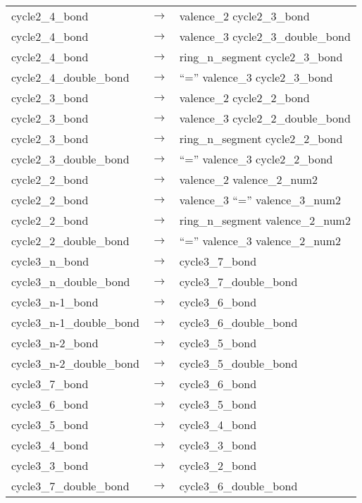 \begin{longtable}{m{} p{} p{}}
    cycle2\_4\_bond & $\rightarrow$ & valence\_2 cycle2\_3\_bond \\
    cycle2\_4\_bond & $\rightarrow$ & valence\_3 cycle2\_3\_double\_bond \\
    cycle2\_4\_bond & $\rightarrow$ & ring\_n\_segment cycle2\_3\_bond \\
    cycle2\_4\_double\_bond & $\rightarrow$ & ``='' valence\_3 cycle2\_3\_bond \\
    cycle2\_3\_bond & $\rightarrow$ & valence\_2 cycle2\_2\_bond \\
    cycle2\_3\_bond & $\rightarrow$ & valence\_3 cycle2\_2\_double\_bond \\
    cycle2\_3\_bond & $\rightarrow$ & ring\_n\_segment cycle2\_2\_bond \\
    cycle2\_3\_double\_bond & $\rightarrow$ & ``='' valence\_3 cycle2\_2\_bond \\
    cycle2\_2\_bond & $\rightarrow$ & valence\_2 valence\_2\_num2 \\
    cycle2\_2\_bond & $\rightarrow$ & valence\_3 ``='' valence\_3\_num2 \\
    cycle2\_2\_bond & $\rightarrow$ & ring\_n\_segment valence\_2\_num2 \\
    cycle2\_2\_double\_bond & $\rightarrow$ & ``='' valence\_3 valence\_2\_num2 \\
    cycle3\_n\_bond & $\rightarrow$ & cycle3\_7\_bond \\
    cycle3\_n\_double\_bond & $\rightarrow$ & cycle3\_7\_double\_bond \\
    cycle3\_n-1\_bond & $\rightarrow$ & cycle3\_6\_bond \\
    cycle3\_n-1\_double\_bond & $\rightarrow$ & cycle3\_6\_double\_bond \\
    cycle3\_n-2\_bond & $\rightarrow$ & cycle3\_5\_bond \\
    cycle3\_n-2\_double\_bond & $\rightarrow$ & cycle3\_5\_double\_bond \\
    cycle3\_7\_bond & $\rightarrow$ & cycle3\_6\_bond \\
    cycle3\_6\_bond & $\rightarrow$ & cycle3\_5\_bond \\
    cycle3\_5\_bond & $\rightarrow$ & cycle3\_4\_bond \\
    cycle3\_4\_bond & $\rightarrow$ & cycle3\_3\_bond \\
    cycle3\_3\_bond & $\rightarrow$ & cycle3\_2\_bond \\
    cycle3\_7\_double\_bond & $\rightarrow$ & cycle3\_6\_double\_bond \\

\end{longtable}
